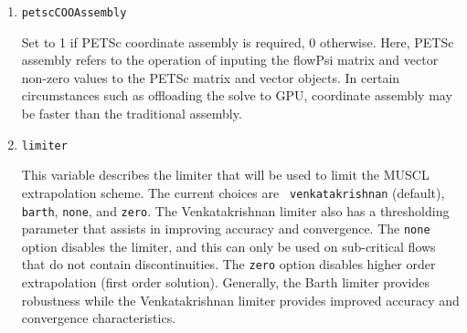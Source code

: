 \documentclass{article}
\begin{document}
\begin{enumerate}
To specify PETSc options that are not specific to the KSP object of a
particular variable, use {\tt generic=options(...)}. For example, the
following listing allows gathering PETSc performance logging
information and also prints unused options at the end of the
simulation.
\begin{verbatim}
PETSCSolverControls: <
  generic=options(log_view=":filename.txt:ascii_flamegraph", options_left)
>
\end{verbatim}
Here are a few options that could be useful. Refer to the PETSc manual
for further information.
\begin{enumerate}
\item {\tt log\_view} prints summary log information. Value of {\tt
  :filename.txt:ascii\_flamegraph} saves the logging information in a
  format suitable for visualizing as a Flame graph.
\item {\tt log\_view\_memory} displays memory usage in each PETSc
  event.
\item {\tt log\_view\_gpu\_time} displays time in each event for GPU
  kernels, but slows down the computation.
\item {\tt options\_left} prints information about unused options at
  the end of the simulation.
\item {\tt options\_view} prints a table of all runtime options
  specified.
\end{enumerate}

Note for GPU offloading: Special options for cluster manager (such as
Slurm or PBS) may be required to provide mapping between node-local
MPI rank and node-local GPU device. Slurm provides {\tt --gpu-bind}
option to specify the mapping. If such mapping is not specified, each
rank on the node may create process contexts on a single GPU device
which may cause memory overflow and eventually terminate the
simulation.

\item {\tt petscCOOAssembly}

  Set to 1 if PETSc coordinate assembly is required, 0
  otherwise. Here, PETSc assembly refers to the operation of inputing
  the flowPsi matrix and vector non-zero values to the PETSc matrix
  and vector objects. In certain circumstances such as offloading the
  solve to GPU, coordinate assembly may be faster than the traditional
  assembly.

\item {\tt limiter }

  This variable describes the limiter that will be used to limit the
  MUSCL extrapolation scheme.  The current choices are {\tt
    venkatakrishnan} (default), {\tt barth}, {\tt none}, and {\tt zero}.  
  The Venkatakrishnan limiter also has a thresholding parameter
  that assists in improving accuracy and convergence.  The {\tt none}
  option disables the limiter, and this can only be used on
  sub-critical flows that do not contain discontinuities.  The
  {\tt zero} option disables higher order extrapolation (first order solution).
  Generally, the Barth limiter provides robustness while the Venkatakrishnan
  limiter provides improved accuracy and convergence characteristics.
  

\end{enumerate}
\end{document}
